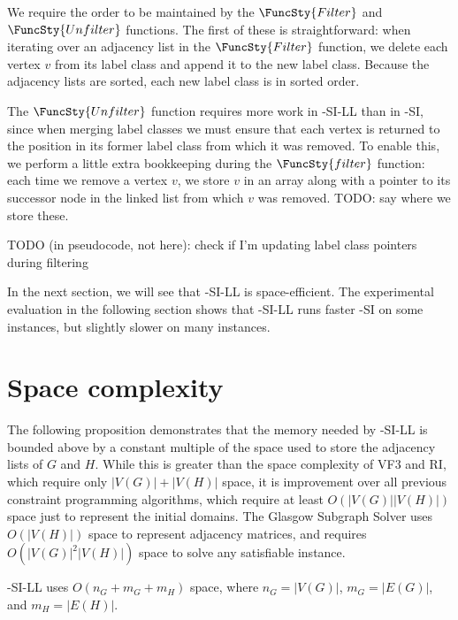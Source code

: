 We require the order to be maintained
by the $\FuncSty{Filter}$ and $\FuncSty{Unfilter}$ functions.  The first of these is straightforward:
when iterating over an adjacency list in the $\FuncSty{Filter}$ function, we delete each vertex $v$
from its label class and append it to the new label class.  Because the adjacency lists are sorted,
each new label class is in sorted order.

The $\FuncSty{Unfilter}$ function requires more work in \McSplit-SI-LL than in \McSplit-SI,
since when merging label classes we must ensure that each vertex is returned to the position
in its former label class from which it was removed.  To enable this, we perform a little extra
bookkeeping during the $\FuncSty{filter}$ function: each time we remove a vertex $v$, we store
$v$ in an array along with a pointer to its successor node in the linked list from which $v$
was removed.  TODO: say where we store these.

TODO (in pseudocode, not here): check if I'm updating label class pointers during filtering

In the next section, we will see that \McSplit-SI-LL is space-efficient.  The experimental evaluation
in the following section shows that \McSplit-SI-LL runs faster \McSplit-SI on some instances, but
slightly slower on many instances.

\FloatBarrier

\section{Space complexity}

The following proposition demonstrates that the memory needed by \McSplit-SI-LL
is bounded above by a constant multiple of the space used to store the adjacency
lists of $G$ and $H$.  While this is greater than the space complexity of 
VF3 and RI, which require only $|V(G)| + |V(H)|$ space, it is improvement
over all previous constraint programming algorithms, which
require at least $O(|V(G)| |V(H)|)$ space just to represent
the initial domains.  The Glasgow Subgraph Solver uses $O(|V(H)|)$ space
to represent adjacency matrices, and requires $O(|V(G)|^2|V(H)|)$ space
to solve any satisfiable instance.

\begin{proposition}\label{mcsplit-si-space}
    \McSplit-SI-LL uses $O(n_G + m_G + m_H)$ space, where
    $n_G=|V(G)|$,
    $m_G=|E(G)|$, and
    $m_H=|E(H)|$.
\end{proposition}

